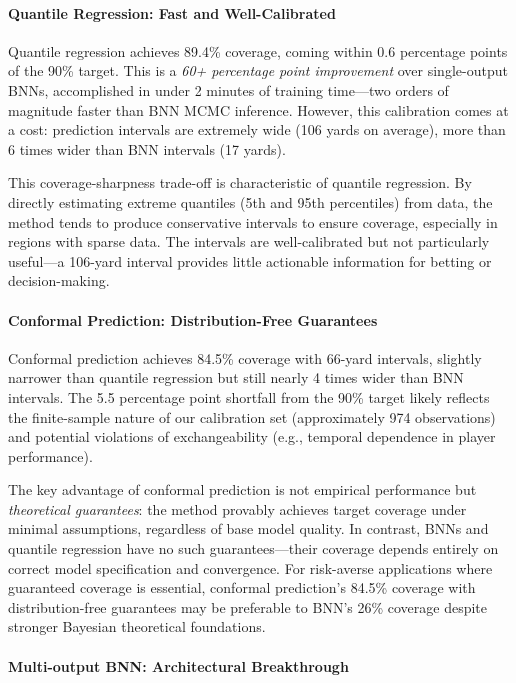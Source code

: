 \paragraph{Quantile Regression: Fast and Well-Calibrated}

Quantile regression achieves 89.4\% coverage, coming within 0.6 percentage points of the 90\% target. This is a \textit{60+ percentage point improvement} over single-output BNNs, accomplished in under 2 minutes of training time—two orders of magnitude faster than BNN MCMC inference. However, this calibration comes at a cost: prediction intervals are extremely wide (106 yards on average), more than 6 times wider than BNN intervals (17 yards).

This coverage-sharpness trade-off is characteristic of quantile regression. By directly estimating extreme quantiles (5th and 95th percentiles) from data, the method tends to produce conservative intervals to ensure coverage, especially in regions with sparse data. The intervals are well-calibrated but not particularly useful—a 106-yard interval provides little actionable information for betting or decision-making.

\paragraph{Conformal Prediction: Distribution-Free Guarantees}

Conformal prediction achieves 84.5\% coverage with 66-yard intervals, slightly narrower than quantile regression but still nearly 4 times wider than BNN intervals. The 5.5 percentage point shortfall from the 90\% target likely reflects the finite-sample nature of our calibration set (approximately 974 observations) and potential violations of exchangeability (e.g., temporal dependence in player performance).

The key advantage of conformal prediction is not empirical performance but \textit{theoretical guarantees}: the method provably achieves target coverage under minimal assumptions, regardless of base model quality. In contrast, BNNs and quantile regression have no such guarantees—their coverage depends entirely on correct model specification and convergence. For risk-averse applications where guaranteed coverage is essential, conformal prediction's 84.5\% coverage with distribution-free guarantees may be preferable to BNN's 26\% coverage despite stronger Bayesian theoretical foundations.

\paragraph{Multi-output BNN: Architectural Breakthrough}

